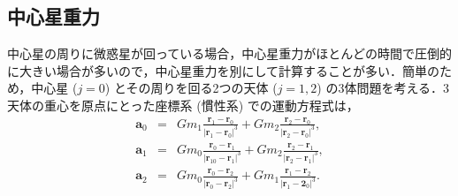 \documentclass[11pt,a4paper,oneside,onecolumn]{jarticle}
\begin{document}
\subsection{中心星重力}
中心星の周りに微惑星が回っている場合，中心星重力がほとんどの時間で圧倒的に大きい場合が多いので，中心星重力を別にして計算することが多い．簡単のため，中心星 ($j = 0$) とその周りを回る2つの天体 ($j = 1, 2$) の3体問題を考える．3天体の重心を原点にとった座標系 (慣性系) での運動方程式は，
\begin{eqnarray}
{\bm a}_0 & = & G m_1 \frac{{\bm r}_1 - {\bm r}_0}{|{\bm r}_1 - {\bm r}_0|^3} + G m_2  \frac{{\bm r}_2 - {\bm r}_0}{|{\bm r}_2 - {\bm r}_0|^3}, \label{eq:a0}\\
{\bm a}_1 & = & G m_0 \frac{{\bm r}_0 - {\bm r}_1}{|{\bm r}_10- {\bm r}_1|^3} + G m_2  \frac{{\bm r}_2 - {\bm r}_1}{|{\bm r}_2 - {\bm r}_1|^3}, \label{eq:a1}\\
{\bm a}_2 & = & G m_0 \frac{{\bm r}_0 - {\bm r}_2}{|{\bm r}_0 - {\bm r}_2|^3} + G m_1  \frac{{\bm r}_1 - {\bm r}_2}{|{\bm r}_1 - {\bm 2}_0|^3}. \label{eq:a2}
\end{eqnarray}
\end{document}
